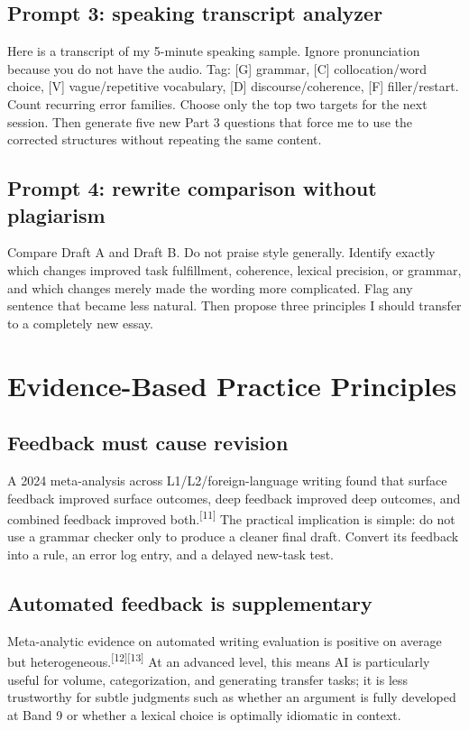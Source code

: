 \documentclass[11pt,a4paper]{article}
\newcommand{\src}[1]{\textsuperscript{[#1]}}
\begin{document}
\subsection{Prompt 3: speaking transcript analyzer}
\begin{aibox}
\small
Here is a transcript of my 5-minute speaking sample. Ignore pronunciation because you do not have the audio. Tag: [G] grammar, [C] collocation/word choice, [V] vague/repetitive vocabulary, [D] discourse/coherence, [F] filler/restart. Count recurring error families. Choose only the top two targets for the next session. Then generate five new Part 3 questions that force me to use the corrected structures without repeating the same content.
\end{aibox}

\subsection{Prompt 4: rewrite comparison without plagiarism}
\begin{aibox}
\small
Compare Draft A and Draft B. Do not praise style generally. Identify exactly which changes improved task fulfillment, coherence, lexical precision, or grammar, and which changes merely made the wording more complicated. Flag any sentence that became less natural. Then propose three principles I should transfer to a completely new essay.
\end{aibox}

\section{Evidence-Based Practice Principles}

\subsection{Feedback must cause revision}
A 2024 meta-analysis across L1/L2/foreign-language writing found that surface feedback improved surface outcomes, deep feedback improved deep outcomes, and combined feedback improved both.\src{11} The practical implication is simple: do not use a grammar checker only to produce a cleaner final draft. Convert its feedback into a rule, an error log entry, and a delayed new-task test.

\subsection{Automated feedback is supplementary}
Meta-analytic evidence on automated writing evaluation is positive on average but heterogeneous.\src{12}\src{13} At an advanced level, this means AI is particularly useful for volume, categorization, and generating transfer tasks; it is less trustworthy for subtle judgments such as whether an argument is fully developed at Band 9 or whether a lexical choice is optimally idiomatic in context.
\end{document}
